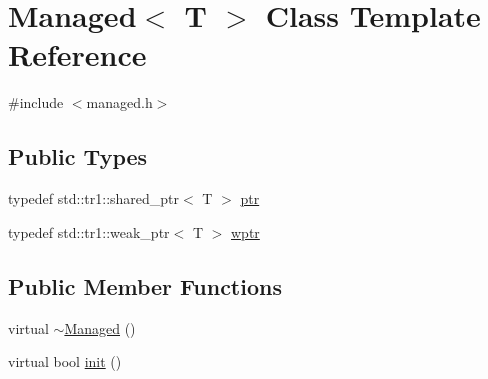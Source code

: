 \hypertarget{class_managed}{\section{Managed$<$ T $>$ Class Template Reference}
\label{class_managed}
}


{\ttfamily \#include $<$managed.\-h$>$}

\subsection*{Public Types}
\begin{DoxyCompactItemize}
\item 
typedef std\-::tr1\-::shared\-\_\-ptr$<$ T $>$ \hyperlink{class_managed_a59aa857eaf753735f65130812e98e9a9}{ptr}
\item 
typedef std\-::tr1\-::weak\-\_\-ptr$<$ T $>$ \hyperlink{class_managed_aa219122b66e6deed111caa6ecf05e724}{wptr}
\end{DoxyCompactItemize}
\subsection*{Public Member Functions}
\begin{DoxyCompactItemize}
\item 
virtual \hyperlink{class_managed_a6357bd91451b81f5bfee71eb52e2ec98}{$\sim$\-Managed} ()
\item 
virtual bool \hyperlink{class_managed_a6fafc7af5aaedd541c3c50883194253a}{init} ()
\end{DoxyCompactItemize}
